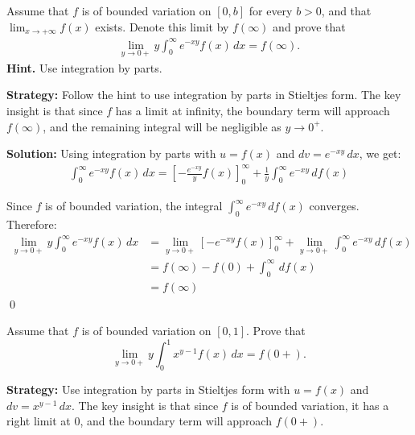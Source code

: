\begin{problembox}
\begin{problemstatement}
Assume that $f$ is of bounded variation on $[0, b]$ for every $b > 0$, and that $\lim_{x \to +\infty} f(x)$ exists. Denote this limit by $f(\infty)$ and prove that
\begin{align*}
\lim_{y \to 0+} y \int_0^\infty e^{-xy}f(x) \, dx = f(\infty).
\end{align*}
\textbf{Hint.} Use integration by parts.
\end{problemstatement}
\end{problembox}

\noindent\textbf{Strategy:} Follow the hint to use integration by parts in Stieltjes form. The key insight is that since $f$ has a limit at infinity, the boundary term will approach $f(\infty)$, and the remaining integral will be negligible as $y \to 0^+$.

\bigskip\noindent\textbf{Solution:}
Using integration by parts with $u = f(x)$ and $dv = e^{-xy} \, dx$, we get:
\begin{align*}
\int_0^\infty e^{-xy}f(x) \, dx = \left[-\frac{e^{-xy}}{y} f(x)\right]_0^\infty + \frac{1}{y} \int_0^\infty e^{-xy} \, df(x)
\end{align*}

Since $f$ is of bounded variation, the integral $\int_0^\infty e^{-xy} \, df(x)$ converges. Therefore:
\begin{align*}
\lim_{y \to 0+} y \int_0^\infty e^{-xy}f(x) \, dx &= \lim_{y \to 0+} \left[-e^{-xy} f(x)\right]_0^\infty + \lim_{y \to 0+} \int_0^\infty e^{-xy} \, df(x) \\
&= f(\infty) - f(0) + \int_0^\infty \, df(x) \\
&= f(\infty)
\end{align*}\qed


\begin{problembox}
\begin{problemstatement}
Assume that $f$ is of bounded variation on $[0, 1]$. Prove that
\[\lim_{y \to 0+} y \int_0^1 x^{y-1}f(x) \, dx = f(0+).\]
\end{problemstatement}
\end{problembox}

\noindent\textbf{Strategy:} Use integration by parts in Stieltjes form with $u = f(x)$ and $dv = x^{y-1} \, dx$. The key insight is that since $f$ is of bounded variation, it has a right limit at $0$, and the boundary term will approach $f(0+)$.

